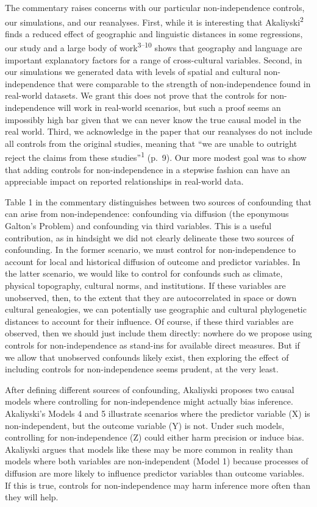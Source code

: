 \documentclass[
  man, donotrepeattitle,floatsintext]{apa6}
\begin{document}
The commentary raises concerns with our particular non-independence controls,
our simulations, and our reanalyses. First, while it is interesting that
Akaliyski\textsuperscript{2} finds a reduced effect of geographic and linguistic
distances in some regressions, our study and a large body of work\textsuperscript{3--10} shows that geography and language are important
explanatory factors for a range of cross-cultural variables. Second, in our
simulations we generated data with levels of spatial and cultural
non-independence that were comparable to the strength of non-independence
found in real-world datasets. We grant this does not prove that the controls
for non-independence will work in real-world scenarios, but such a proof
seems an impossibly high bar given that we can never know the true causal
model in the real world. Third, we acknowledge in the paper that our
reanalyses do not include all controls from the original studies, meaning
that ``we are unable to outright reject the claims from these studies''\textsuperscript{1} (p.~9). Our more modest goal was to show that adding
controls for non-independence in a stepwise fashion can have an appreciable
impact on reported relationships in real-world data.

Table 1 in the commentary distinguishes between two sources of
confounding that can arise from non-independence: confounding via diffusion
(the eponymous Galton's Problem) and confounding via third variables. This
is a useful contribution, as in hindsight we did not clearly delineate these
two sources of confounding. In the former scenario, we must control for
non-independence to account for local and historical diffusion of outcome
and predictor variables. In the latter scenario, we would like to control
for confounds such as climate, physical topography, cultural norms, and
institutions. If these variables are unobserved, then, to the extent that
they are autocorrelated in space or down cultural genealogies, we can
potentially use geographic and cultural phylogenetic distances to account
for their influence. Of course, if these third variables are observed, then
we should just include them directly: nowhere do we propose using controls
for non-independence as stand-ins for available direct measures. But if we
allow that unobserved confounds likely exist, then exploring the effect of
including controls for non-independence seems prudent, at the very least.

After defining different sources of confounding, Akaliyski proposes two
causal models where controlling for non-independence might actually bias
inference. Akaliyski's Models 4 and 5 illustrate scenarios where the predictor
variable (X) is non-independent, but the outcome variable (Y) is not. Under
such models, controlling for non-independence (Z) could either harm precision
or induce bias. Akaliyski argues that models like these may be more common
in reality than models where both variables are non-independent (Model 1)
because processes of diffusion are more likely to influence predictor
variables than outcome variables. If this is true, controls for
non-independence may harm inference more often than they will help.
\end{document}
